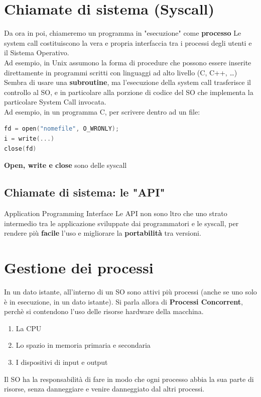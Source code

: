 \section{Chiamate di sistema (Syscall)}
Da ora in poi, chiameremo un programma in "esecuzione" come \textbf{processo}
Le system call costituiscono la vera e propria interfaccia tra i processi degli utenti e il Sistema Operativo.\\
Ad esempio, in Unix assumono la forma di procedure che possono essere inserite direttamente in programmi scritti con linguaggi ad alto livello (C, C++, …) \\
Sembra di usare una \textbf{subroutine}, ma l’esecuzione della system call trasferisce il controllo al SO, e in particolare alla porzione di codice del SO che implementa la particolare System Call invocata. \\
Ad esempio, in un programma C, per scrivere dentro ad un file:\\
\begin{lstlisting}[language=C]
fd = open("nomefile", O_WRONLY);
i = write(...)
close(fd)
\end{lstlisting}
\textbf{Open, write e close} sono delle syscall

\subsection{Chiamate di sistema: le "API"}
Application Programming Interface
Le API non sono ltro che uno strato intermedio tra le applicazione sviluppate dai programmatori e le syscall, per rendere più \textbf{facile} l'uso e migliorare la \textbf{portabilità} tra versioni.


\section{Gestione dei processi}
In un dato istante, all’interno di un SO sono attivi più processi (anche se uno solo è in esecuzione, in un dato istante).
Si parla allora di \textbf{Processi Concorrent}, perchè si contendono l'uso delle risorse hardware della macchina. \\
\begin{enumerate}
    \item La CPU
    \item Lo spazio in memoria primaria e secondaria
    \item I dispositivi di input e output
\end{enumerate}
Il SO ha la responsabilità di fare in modo che ogni processo abbia la sua parte di risorse, senza danneggiare e venire danneggiato dal altri processi.\\

